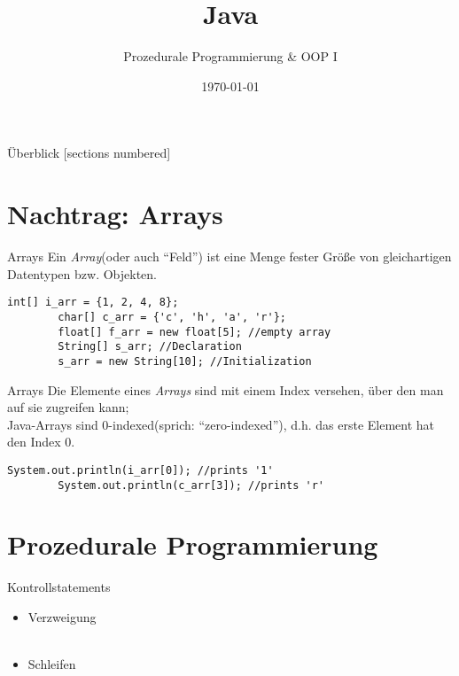 

\usepackage{ulem}
\usepackage{mathtools}

\title{Java}
\subtitle{Prozedurale Programmierung \& OOP I}
\date{\today}



\begin{frame}
	\titlepage
\end{frame}
\begin{frame}{Überblick}
	[sections numbered]
	\tableofcontents
\end{frame}

\section{Nachtrag: Arrays}
\begin{frame}[fragile]{Arrays}
    Ein \textit{Array}(oder auch \enquote{Feld}) ist eine Menge fester Größe von gleichartigen Datentypen bzw. Objekten.
    \begin{lstlisting}[gobble=8]
        int[] i_arr = {1, 2, 4, 8};
        char[] c_arr = {'c', 'h', 'a', 'r'};
        float[] f_arr = new float[5]; //empty array
        String[] s_arr; //Declaration
        s_arr = new String[10]; //Initialization
    \end{lstlisting}
\end{frame}

\begin{frame}[fragile]{Arrays}
    Die Elemente eines \textit{Arrays} sind mit einem Index versehen, über den man auf sie zugreifen kann; \\
    Java-Arrays sind 0-indexed(sprich: \enquote{zero-indexed}), d.h. das erste Element hat den Index 0.
    \begin{lstlisting}[gobble=8]
        System.out.println(i_arr[0]); //prints '1'
        System.out.println(c_arr[3]); //prints 'r'
    \end{lstlisting}
\end{frame}

\section{Prozedurale Programmierung}
\begin{frame}{Kontrollstatements}
	
    \begin{itemize}[<+->]
        \item Verzweigung \\
             \\
        \item Schleifen \\
             \\
	\end{itemize}
\end{frame}

